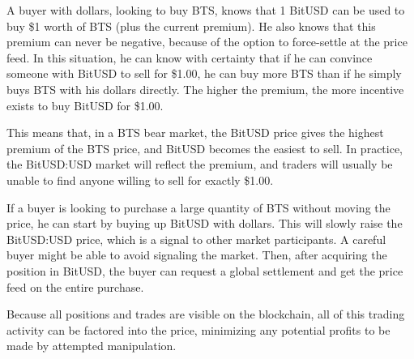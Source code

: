 A buyer with dollars, looking to buy BTS, knows that 1 BitUSD can be used to
buy \$1 worth of BTS (plus the current premium). He also knows that this premium
can never be negative, because of the option to force-settle at the price feed.
In this situation, he can know with certainty that if he can convince someone
with BitUSD to sell for \$1.00, he can buy more BTS than if he simply buys BTS
with his dollars directly. The higher the premium, the more incentive exists to
buy BitUSD for \$1.00.

This means that, in a BTS bear market, the BitUSD price gives the highest
premium of the BTS price, and BitUSD becomes the easiest to sell. In practice,
the BitUSD:USD market will reflect the premium, and traders will usually be
unable to find anyone willing to sell for exactly \$1.00.

If a buyer is looking to purchase a large quantity of BTS without moving the
price, he can start by buying up BitUSD with dollars. This will slowly raise
the BitUSD:USD price, which is a signal to other market participants. A careful
buyer might be able to avoid signaling the market. Then, after acquiring the
position in BitUSD, the buyer can request a global settlement and get the price
feed on the entire purchase.

Because all positions and trades are visible on the blockchain, all of this
trading activity can be factored into the price, minimizing any potential
profits to be made by attempted manipulation.
